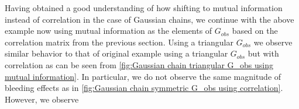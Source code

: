 \documentclass[../Thesis.tex]{subfiles}
\begin{document}

Having obtained a good understanding of how shifting to mutual information instead of correlation in the case of Gaussian chains, we continue with the above example now using mutual information as the elements of $G_{obs}$ based on the correlation matrix from the previous section. Using a triangular $G_{obs}$ we observe similar behavior to that of original example using a triangular $G_{obs}$ but with correlation as can be seen from \autoref{fig:Gaussian chain triangular G_obs using mutual information}. In particular, we do not observe the same magnitude of bleeding effects as in \autoref{fig:Gaussian chain symmetric G_obs using correlation}. However, we observe
\end{document}
